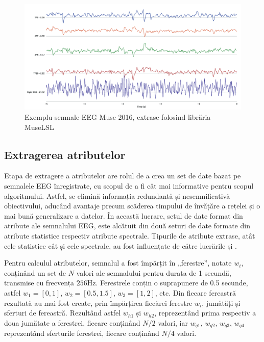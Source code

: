 \begin{figure}[ht]
\centering
\includegraphics[width=\textwidth, keepaspectratio]{fig/cap3/museEEGplot.png}
\caption{Exemplu semnale EEG Muse 2016, extrase folosind librăria MuseLSL \cite{online:muselsl}}
\label{fig:muse_eeg_sample}
\end{figure}

\subsection{Extragerea atributelor}
Etapa de extragere a atributelor are rolul de a crea un set de date bazat pe semnalele EEG înregistrate, cu scopul de a fi cât mai informative pentru scopul algoritmului. Astfel, se elimină informația redundantă și nesemnificativă obiectivului, aducând avantaje precum scăderea timpului de învățăre a rețelei și o mai bună generalizare a datelor. În această lucrare, setul de date format din atribute ale semnalului EEG, este alcătuit din două seturi de date formate din atribute statistice respectiv atribute spectrale. Tipurile de atribute extrase, atât cele statistice cât și cele spectrale, au fost influențate de către lucrările \cite{eeg-cnn:2020} și \cite{eeg:2018}.

Pentru calculul atributelor, semnalul a fost împărțit în „ferestre”, notate $w_i$, conținând un set de $N$ valori ale semnalului pentru durata de 1 secundă, transmise cu frecvența $256\si{\hertz}$. Ferestrele conțin o suprapunere de 0.5 secunde, astfel $w_1=[0,1]$, $w_2=[0.5,1.5]$, $w_3=[1,2]$, etc. Din fiecare fereastră rezultată au mai fost create, prin împărțirea fiecărei ferestre $w_i$, jumătăți și sferturi de fereastră. Rezultând astfel $w_{h1}$ și $w_{h2}$, reprezentând prima respectiv a doua jumătate a ferestrei, fiecare conținând $N/2$ valori, iar $w_{q1}$, $w_{q2}$, $w_{q3}$, $w_{q4}$ reprezentând sferturile ferestrei, fiecare conținând $N/4$ valori.

